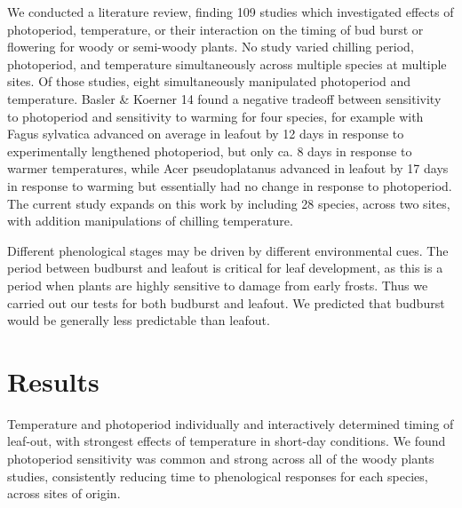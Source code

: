 \documentclass{article}
\begin{document}
We conducted a literature review, finding 109 studies which investigated effects of photoperiod, temperature, or their interaction on the timing of bud burst or flowering for woody or semi-woody plants.  No study varied chilling period, photoperiod, and temperature simultaneously across multiple species at multiple sites. Of those studies, eight simultaneously manipulated photoperiod and temperature. Basler \& Koerner 14 found a negative tradeoff between sensitivity to photoperiod and sensitivity to warming for four species, for example with Fagus sylvatica advanced on average in leafout by 12 days in response to experimentally lengthened photoperiod, but only ca. 8 days in response to warmer temperatures, while Acer pseudoplatanus advanced in leafout by 17 days in response to warming but essentially had no change in response to photoperiod. The current study expands on this work by including 28 species, across two sites, with addition manipulations of chilling temperature.

Different phenological stages may be driven by different environmental cues. The period between budburst and leafout is critical for leaf development, as this is a period when plants are highly sensitive to damage from early frosts. Thus we carried out our tests for both budburst and leafout. We predicted that budburst would be generally less predictable than leafout.



\section*{Results}

Temperature and photoperiod individually and interactively determined timing of leaf-out, with strongest effects of temperature in short-day conditions. We found photoperiod sensitivity was common and strong across all of the woody plants studies, consistently reducing time to phenological responses for each species, across sites of origin. 
\end{document}
